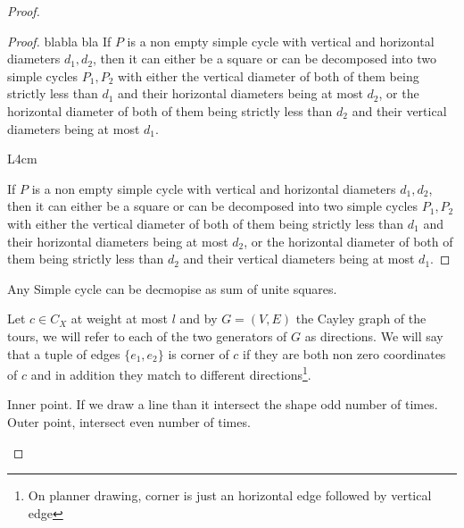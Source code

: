 \begin{proof}
  \begin{proof} blabla bla
If $P$ is a non empty simple cycle with vertical and horizontal diameters $d_{1}, d_{2}$, then it can either be a square or can be decomposed into two simple cycles $P_{1},P_{2}$ with either the vertical diameter of both of them being strictly less than $d_{1}$ and their horizontal diameters being at most $d_{2}$, or the horizontal diameter of both of them being strictly less than $d_{2}$ and their vertical diameters being at most $d_{1}$.
    \begin{wrapfigure}{L}{4cm}
      \centering
{}
\end{wrapfigure}
If $P$ is a non empty simple cycle with vertical and horizontal diameters $d_{1}, d_{2}$, then it can either be a square or can be decomposed into two simple cycles $P_{1},P_{2}$ with either the vertical diameter of both of them being strictly less than $d_{1}$ and their horizontal diameters being at most $d_{2}$, or the horizontal diameter of both of them being strictly less than $d_{2}$ and their vertical diameters being at most $d_{1}$.

  \end{proof}

  \begin{claim}
  Any Simple cycle can be decmopise as sum of unite squares.     
  \end{claim}

  Let $c \in C_{X}$ at weight at most $l$ and by $G = (V,E)$ the Cayley graph of the tours, we will refer to each of the two generators of $G$ as directions. We will say that a tuple of edges $\{e_{1},e_{2}\}$ is corner of $c$ if they are both non zero coordinates of $c$ and in addition they match to different directions\footnote{On planner drawing, corner is just an horizontal edge followed by vertical edge}.        
 
  \begin{definition}
    Inner point.   If we draw a line than it intersect the shape odd number of times. Outer point, intersect even number of times.
  \end{definition}


\end{proof}
